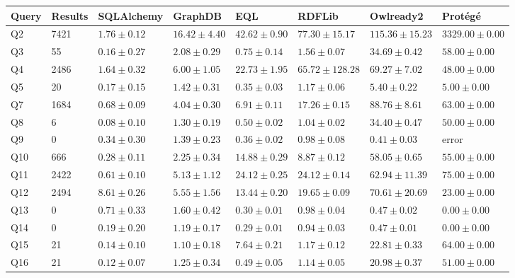 \begin{tabular}{llllllll}
\toprule
\textbf{Query} & \textbf{Results} & \textbf{SQLAlchemy} & \textbf{GraphDB} & \textbf{EQL} & \textbf{RDFLib} & \textbf{Owlready2} & \textbf{Prot\'eg\'e}\\
\midrule
Q2 & 7421 & $\mathbf{1.76 \pm 0.12}$ & $16.42 \pm 4.40$ & $42.62 \pm 0.90$ & $77.30 \pm 15.17$ & $115.36 \pm 15.23$ & $3329.00 \pm 0.00$\\
Q3 & 55 & $\mathbf{0.16 \pm 0.27}$ & $2.08 \pm 0.29$ & $0.75 \pm 0.14$ & $1.56 \pm 0.07$ & $34.69 \pm 0.42$ & $58.00 \pm 0.00$\\
Q4 & 2486 & $\mathbf{1.64 \pm 0.32}$ & $6.00 \pm 1.05$ & $22.73 \pm 1.95$ & $65.72 \pm 128.28$ & $69.27 \pm 7.02$ & $48.00 \pm 0.00$\\
Q5 & 20 & $\mathbf{0.17 \pm 0.15}$ & $1.42 \pm 0.31$ & $0.35 \pm 0.03$ & $1.17 \pm 0.06$ & $5.40 \pm 0.22$ & $5.00 \pm 0.00$\\
Q7 & 1684 & $\mathbf{0.68 \pm 0.09}$ & $4.04 \pm 0.30$ & $6.91 \pm 0.11$ & $17.26 \pm 0.15$ & $88.76 \pm 8.61$ & $63.00 \pm 0.00$\\
Q8 & 6 & $\mathbf{0.08 \pm 0.10}$ & $1.30 \pm 0.19$ & $0.50 \pm 0.02$ & $1.04 \pm 0.02$ & $34.40 \pm 0.47$ & $50.00 \pm 0.00$\\
Q9 & 0 & $\mathbf{0.34 \pm 0.30}$ & $1.39 \pm 0.23$ & $0.36 \pm 0.02$ & $0.98 \pm 0.08$ & $0.41 \pm 0.03$ & error\\
Q10 & 666 & $\mathbf{0.28 \pm 0.11}$ & $2.25 \pm 0.34$ & $14.88 \pm 0.29$ & $8.87 \pm 0.12$ & $58.05 \pm 0.65$ & $55.00 \pm 0.00$\\
Q11 & 2422 & $\mathbf{0.61 \pm 0.10}$ & $5.13 \pm 1.12$ & $24.12 \pm 0.25$ & $24.12 \pm 0.14$ & $62.94 \pm 11.39$ & $75.00 \pm 0.00$\\
Q12 & 2494 & $8.61 \pm 0.26$ & $\mathbf{5.55 \pm 1.56}$ & $13.44 \pm 0.20$ & $19.65 \pm 0.09$ & $70.61 \pm 20.69$ & $23.00 \pm 0.00$\\
Q13 & 0 & $0.71 \pm 0.33$ & $1.60 \pm 0.42$ & $0.30 \pm 0.01$ & $0.98 \pm 0.04$ & $0.47 \pm 0.02$ & $\mathbf{0.00 \pm 0.00}$\\
Q14 & 0 & $0.19 \pm 0.20$ & $1.19 \pm 0.17$ & $0.29 \pm 0.01$ & $0.94 \pm 0.03$ & $0.47 \pm 0.01$ & $\mathbf{0.00 \pm 0.00}$\\
Q15 & 21 & $\mathbf{0.14 \pm 0.10}$ & $1.10 \pm 0.18$ & $7.64 \pm 0.21$ & $1.17 \pm 0.12$ & $22.81 \pm 0.33$ & $64.00 \pm 0.00$\\
Q16 & 21 & $\mathbf{0.12 \pm 0.07}$ & $1.25 \pm 0.34$ & $0.49 \pm 0.05$ & $1.14 \pm 0.05$ & $20.98 \pm 0.37$ & $51.00 \pm 0.00$\\

\end{tabular}
